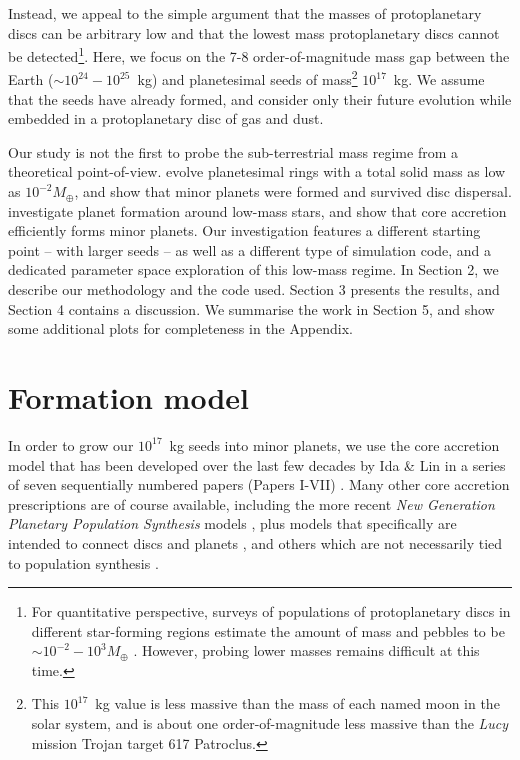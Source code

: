 \documentclass[useAMS,usenatbib]{mn2e}
\newcommand{\rev}{ }
\begin{document}
Instead, we appeal to the simple argument that the masses of protoplanetary discs can be arbitrary low and that the lowest mass protoplanetary discs cannot be detected\footnote{For quantitative perspective, surveys of populations of protoplanetary discs in different star-forming regions estimate the amount of mass and pebbles to be $\sim 10^{-2}-10^3M_{\oplus}$ \citep{baretal2016,pasetal2016,lonetal2018,cieetal2019,tobetal2020,tycetal2020}. However, probing lower masses remains difficult at this time.}. Here, we focus on the 7-8 order-of-magnitude mass gap between the Earth ($\sim 10^{24}-10^{25}$~kg) and planetesimal seeds of mass\footnote{This $10^{17}$~kg value is less massive than the mass of each named moon in the solar system, and is about one order-of-magnitude less massive than the {\it Lucy} mission Trojan target 617 Patroclus.} $10^{17}$~kg. We assume that the seeds have already formed, and consider only their future evolution while embedded in a protoplanetary disc of gas and dust.

Our study is not the first to probe the sub-terrestrial mass regime from a theoretical point-of-view. \cite{najetal2022} evolve planetesimal rings with a total solid mass as low as $10^{-2} M_{\oplus}$, and show that minor planets were formed and survived disc dispersal. \cite{sanetal2024} investigate planet formation around low-mass stars, and show that core accretion efficiently forms minor planets. Our investigation features a different starting point -- with larger seeds -- as well as a different type of simulation code, and a dedicated parameter space exploration of this low-mass regime. In Section 2, we describe our methodology and the code used. Section 3 presents the results, and Section 4 contains a discussion. We summarise the work in Section 5, {\rev and show some additional plots for completeness in the Appendix}.

 




\section{Formation model}

In order to grow our $10^{17}$~kg seeds into minor planets, we use the core accretion model that has been developed over the last few decades by Ida \& Lin in a series of seven sequentially numbered papers (Papers I-VII) \citep{idalin2004a,idalin2004b,idalin2005,idalin2008a,idalin2008b,idalin2010,idaetal2013}. Many other core accretion prescriptions are of course available, including the more recent {\it New Generation Planetary Population Synthesis} models \citep{buretal2021,emsetal2021a,emsetal2021b,misetal2021,schetal2021a,schetal2021b}, plus models that specifically are intended to connect discs and planets \citep{buretal2022,emsetal2023}, and others which are not necessarily tied to population synthesis \citep[see e.g.][]{raymor2022}.
\end{document}
